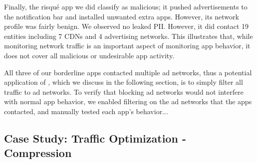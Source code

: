     Finally, the risqu\'{e} app we did classify as malicious; it pushed advertisements to the notification bar and installed unwanted extra apps.
    However, its network profile was fairly benign.
    We observed no leaked PII. However, it did contact 19 entities including 7 CDNs and 4 advertising networks.
    This illustrates that, while monitoring network traffic is an important aspect of monitoring app behavior, it does not cover all malicious or undesirable app activity.

    All three of our borderline apps contacted multiple ad networks, thus a potential application of \meddle, which we discuss in the following section, is to simply filter all traffic to ad networks.
    To verify that blocking ad networks would not interfere with normal app behavior, we enabled filtering on the ad networks that the apps contacted, and manually tested each app's behavior...

\subsection{Case Study: Traffic Optimization - Compression}
\label{sec:case-study-compression}









 




